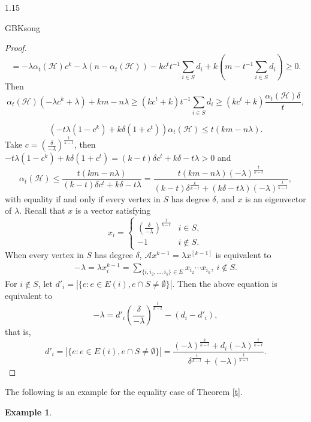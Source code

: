 \documentclass[preprint,12pt]{elsarticle}
\newtheorem{example}[thm]{Example}
\begin{document}
\begin{spacing}{1.15}
\begin{CJK*}{GBK}{song}
\begin{proof}
\[= - {\lambda} \alpha_{t}(\mathcal{H}) {c^k} - \lambda (n - {\alpha_{t}}(\mathcal{H}) ) - kc^tt^{-1}\sum_{i\in S}d_i+ k\left( {m - t^{-1}\sum_{i\in S}d_i}\right) \geqslant 0.\]
Then
\[{\alpha _t}(\mathcal{H})\left( {-\lambda {c^k} + \lambda } \right) + km -n \lambda  \geqslant \left( {k{c^t} + k} \right)t^{-1}\sum_{i\in S}d_i \geqslant \left( {k{c^t} + k} \right)\frac{{{\alpha _t}(\mathcal{H})\delta }}{t},\]

\[\left( {-t \lambda \left( {1 - {c^k}} \right) + k \delta \left( {1 + {c^t}} \right)} \right){\alpha _t}(\mathcal{H})\leq t\left( {km - n\lambda } \right).\]
Take $c = {{\left( \frac{\delta }{-\lambda } \right)}^{\frac{1}{k-t}}}$, then
$ -t \lambda \left( {1 - {c}^k} \right) + k \delta \left( {1 + {c}^t} \right) = \left( {k - t} \right)\delta {c}^t + k \delta - t \lambda  > 0$ and
\[{\alpha _t}(\mathcal{H}) \leqslant \frac{{t\left( {km - n \lambda } \right)}}{{\left( {k - t} \right)\delta {c^t} + k \delta  - t \lambda }}=\frac{{t\left( {km - n \lambda } \right){{\left( { - \lambda } \right)}^{\frac{t}{{k - t}}}}}}{{\left( {k - t} \right){\delta ^{\frac{k}{{k - t}}}} + \left( {k \delta  - t\lambda } \right){{\left( { - \lambda } \right)}^{\frac{t}{{k - t}}}}}},\]
with equality if and only if every vertex in $S$ has degree $\delta$, and $x$ is an eigenvector of $\lambda$. Recall that $x$ is a vector satisfying
$${x_i} =
\begin{cases}
 {{\left( \frac{\delta }{-\lambda } \right)}^{\frac{1}{k-t}}} & i \in S,\\
-1 & i \notin S.
\end{cases}
$$
When every vertex in $S$ has degree $\delta$, $\mathcal{A}x^{k-1}=\lambda x^{[k-1]}$ is equivalent to
\begin{eqnarray*}
-\lambda=\lambda x_i^{k-1}=\sum_{\{i,i_2,\ldots,i_k\}\in E}x_{i_2}\cdots x_{i_k},~i\notin S.
\end{eqnarray*}
For $i\notin S$, let $d'_i = \left| \{e: e \in E(i),e\cap S \neq \emptyset \}\right|$. Then the above equation is equivalent to
$$-\lambda = d'_i {{\left( \frac{\delta }{-\lambda } \right)}^{\frac{t}{k-t}}} - (d_i - d'_i),$$
that is,
$$d'_i = \left| {\{ e:e \in E(i),e\cap S \ne \emptyset \} } \right| = \frac{{{{\left( { - \lambda } \right)}^{\frac{k}{{k - t}}}} + {d_i}{{\left( { - \lambda } \right)}^{\frac{t}{{k - t}}}}}}{{{\delta ^{\frac{t}{{k - t}}}} + {{\left( { - \lambda } \right)}^{\frac{t}{{k - t}}}}}}.$$
\end{proof}
The following is an example for the equality case of Theorem \ref{t}.
\begin{example}\label{z}

\end{example}
\end{CJK*}
\end{spacing}
\end{document}
